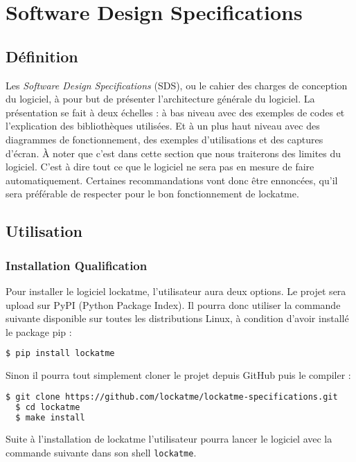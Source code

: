 \chapter{Software Design Specifications}
\newpage

\section{Définition}
Les \emph{Software Design Specifications} (SDS), ou le cahier des charges de conception
du logiciel, à pour but de présenter l'architecture générale du logiciel.
La présentation se fait à deux échelles : à bas niveau avec des exemples de codes et
l'explication des bibliothèques utilisées. Et à un plus haut niveau avec des diagrammes
de fonctionnement, des exemples d'utilisations et des captures d'écran. À noter
que c'est dans cette section que nous traiterons des limites du logiciel. C'est
à dire tout ce que le logiciel ne sera pas en mesure de faire automatiquement.
Certaines recommandations vont donc être ennoncées, qu'il sera préférable de
respecter pour le bon fonctionnement de lockatme.
\section{Utilisation}
  \subsection{Installation Qualification}
Pour installer le logiciel lockatme, l'utilisateur aura deux options. Le
projet sera upload sur PyPI (Python Package Index). Il pourra donc utiliser la commande
suivante disponible sur toutes les distributions Linux, à condition d'avoir
installé le package pip :
\begin{lstlisting}[language=bash]
  $ pip install lockatme
\end{lstlisting}
Sinon il pourra tout simplement cloner le projet depuis GitHub puis le compiler :
\begin{lstlisting}[language=bash]
  $ git clone https://github.com/lockatme/lockatme-specifications.git
  $ cd lockatme
  $ make install
\end{lstlisting}
Suite à l'installation de lockatme l'utilisateur pourra lancer le logiciel
avec la commande suivante dans son shell \verb|lockatme|.

